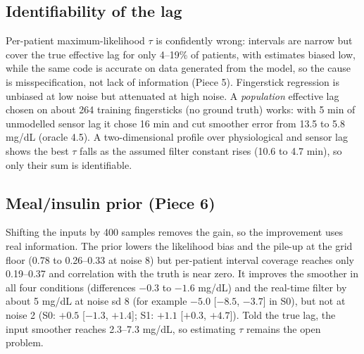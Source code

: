 \documentclass[11pt,a4paper]{article}
\begin{document}
\subsection*{Identifiability of the lag}
Per-patient maximum-likelihood $\tau$ is confidently wrong: intervals are narrow but cover the true effective lag for only 4--19\% of patients, with estimates biased low, while the same code is accurate on data generated from the model, so the cause is misspecification, not lack of information (Piece 5). Fingerstick regression is unbiased at low noise but attenuated at high noise. A \emph{population} effective lag chosen on about 264 training fingersticks (no ground truth) works: with 5 min of unmodelled sensor lag it chose 16 min and cut smoother error from 13.5 to 5.8 mg/dL (oracle 4.5). A two-dimensional profile over physiological and sensor lag shows the best $\tau$ falls as the assumed filter constant rises (10.6 to 4.7 min), so only their sum is identifiable.

\subsection*{Meal/insulin prior (Piece 6)}
Shifting the inputs by 400 samples removes the gain, so the improvement uses real information. The prior lowers the likelihood bias and the pile-up at the grid floor (0.78 to 0.26--0.33 at noise 8) but per-patient interval coverage reaches only 0.19--0.37 and correlation with the truth is near zero. It improves the smoother in all four conditions (differences $-0.3$ to $-1.6$ mg/dL) and the real-time filter by about 5 mg/dL at noise sd 8 (for example $-5.0$ [$-8.5$, $-3.7$] in S0), but not at noise 2 (S0: $+0.5$ [$-1.3$, $+1.4$]; S1: $+1.1$ [$+0.3$, $+4.7$]). Told the true lag, the input smoother reaches 2.3--7.3 mg/dL, so estimating $\tau$ remains the open problem.
\end{document}
